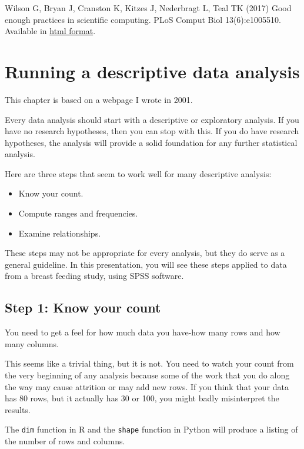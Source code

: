 \documentclass[
  letterpaper,
  DIV=11,
  numbers=noendperiod]{scrreprt}
\providecommand{\tightlist}{%
  \setlength{\itemsep}{0pt}\setlength{\parskip}{0pt}}
\begin{document}
Wilson G, Bryan J, Cranston K, Kitzes J, Nederbragt L, Teal TK (2017)
Good enough practices in scientific computing. PLoS Comput Biol
13(6):e1005510. Available in
\href{https://journals.plos.org/ploscompbiol/article?id=10.1371/journal.pcbi.1005510}{html
format}.


\chapter{Running a descriptive data
analysis}\label{running-a-descriptive-data-analysis}

This chapter is based on a webpage I wrote in 2001.

Every data analysis should start with a descriptive or exploratory
analysis. If you have no research hypotheses, then you can stop with
this. If you do have research hypotheses, the analysis will provide a
solid foundation for any further statistical analysis.

Here are three steps that seem to work well for many descriptive
analysis:

\begin{itemize}
\tightlist
\item
  Know your count.
\item
  Compute ranges and frequencies.
\item
  Examine relationships.
\end{itemize}

These steps may not be appropriate for every analysis, but they do serve
as a general guideline. In this presentation, you will see these steps
applied to data from a breast feeding study, using SPSS software.

\section{Step 1: Know your count}\label{step-1-know-your-count}

You need to get a feel for how much data you have-how many rows and how
many columns.

This seems like a trivial thing, but it is not. You need to watch your
count from the very beginning of any analysis because some of the work
that you do along the way may cause attrition or may add new rows. If
you think that your data has 80 rows, but it actually has 30 or 100, you
might badly misinterpret the results.

The \texttt{dim} function in R and the \texttt{shape} function in Python
will produce a listing of the number of rows and columns.
\end{document}

